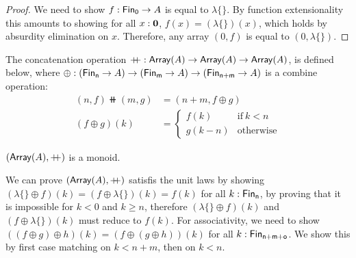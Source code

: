 \begin{proof}
    We need to show $f : \Fin[0] \to A$ is equal to $\lambda\{\}$.
    By function extensionality this amounts to showing for all $x : {\mathbf{0}}$, $f(x) = (\lambda\{\})(x)$,
    which holds by absurdity elimination on $x$.
    Therefore, any array $(0, f)$ is equal to $(0, \lambda\{\})$.
\end{proof}

\begin{definition}[Concatenation]
    The concatenation operation $\mathbin{+\kern -0.4em+} : \operatorname{\mathsf{Array}}(A) \to \operatorname{\mathsf{Array}}(A) \to \operatorname{\mathsf{Array}}(A)$,
    is defined below, where $\oplus : (\Fin[n] \to A) \to (\Fin[m] \to A) \to (\Fin[n+m] \to\nolinebreak A)$
    is a combine operation:
    \begin{align*}
        (n , f) \doubleplus (m , g) & = (n + m , f \oplus g)        \\
        (f \oplus g)(k)             & = \begin{cases}
                                            f(k)     & \text{if}\ k < n \\
                                            g(k - n) & \text{otherwise}
                                        \end{cases}
    \end{align*}
\end{definition}

\begin{propositionrep}%
    $(\operatorname{\mathsf{Array}}(A), \mathbin{+\kern -0.4em+})$ is a monoid.
\end{propositionrep}

\begin{proofsketch}
    We can prove $(\operatorname{\mathsf{Array}}(A), \mathbin{+\kern -0.4em+})$ satisfis the unit laws by showing
    $(\lambda\{\} \oplus f)(k) = (f \oplus \lambda\{\})(k) = f(k)$ for all $k : \Fin[n]$,
    by proving that it is impossible for $k < 0$ and $k \geq n$, therefore
    $(\lambda\{\} \oplus f)(k)$ and $(f \oplus \lambda\{\})(k)$ must reduce to $f(k)$.
    For associativity,
    we need to show $((f \oplus g) \oplus h)(k) = (f \oplus (g \oplus h))(k)$ for all $k : \Fin[n+m+o]$.
    We show this by first case matching on $k < n+m$, then on $k < n$.
\end{proofsketch}


